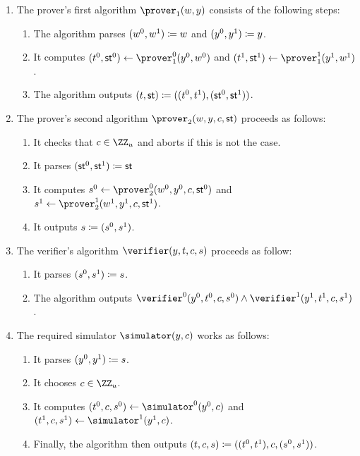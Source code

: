\documentclass[runningheads]{llncs}
\begin{document}
\begin{enumerate}
  \item
    The prover's first algorithm $\prover_1(w,y)$ consists of the following steps:
    \begin{enumerate}
      \item
        The algorithm parses $(w^0,w^1)\coloneqq w$ and $(y^0,y^1)\coloneqq y$.
      \item
        It computes $(t^0,\st^0)\gets\prover_1^0(y^0,w^0)$ and $(t^1,\st^1)\gets\prover_1^1(y^1,w^1)$.
      \item
	The algorithm outputs $(t,\mathsf{st}) \coloneqq ((t^0,t^1),(\mathsf{st}^0,\mathsf{st}^1))$.
    \end{enumerate}
  \item
    The prover's second algorithm $\prover_2(w,y,c,\st)$ proceeds as follows:
    \begin{enumerate}
      \item
        It checks that $c\in\ZZ_u$ and aborts if this is not the case.
      \item
	It parses $(\mathsf{st}^0,\mathsf{st}^1)\coloneqq \mathsf{st}$
      \item
        It computes $s^0\gets\prover_2^0(w^0,y^0,c,\st^0)$ and $s^1\gets\prover_2^1(w^1,y^1,c,\st^1)$.
      \item
        It outputs $s\coloneqq(s^0,s^1)$.
    \end{enumerate}
  \item
    The verifier's algorithm $\verifier(y,t,c,s)$ proceeds as follow:
    \begin{enumerate}
      \item
        It  parses $(s^0,s^1)\coloneqq s$.
      \item
	The algorithm outputs $\verifier^0(y^0,t^0,c,s^0)\land\verifier^1(y^1,t^1,c,s^1)$.
    \end{enumerate}
  \item
    The required simulator $\simulator(y,c)$ works as follows:
    \begin{enumerate}
      \item
        It parses $(y^0,y^1)\coloneqq s$.
      \item
        It chooses $c\in\ZZ_u$.
      \item
        It computes $(t^0,c,s^0)\gets\simulator^0(y^0,c)$ and $(t^1,c,s^1)\gets\simulator^1(y^1,c)$.
      \item
        Finally, the algorithm then outputs $(t,c,s)\coloneqq((t^0,t^1),c,(s^0,s^1))$.
    \end{enumerate}
\end{enumerate}
\end{document}

